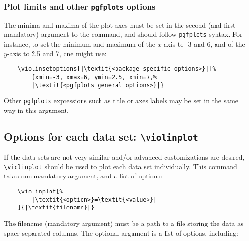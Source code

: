 \documentclass{article}
\begin{document}
\subsubsection{Plot limits and other \texttt{pgfplots} options}

The minima and maxima of the plot axes must be set in the second (and first
mandatory) argument to the command, and should follow \texttt{pgfplots}
syntax. For instance, to set the minimum and maximum of the $x$-axis
to -3 and 6, and of the $y$-axis to 2.5 and 7, one might use:

\begin{verbatim}
	\violinsetoptions[|\textit{<package-specific options>}|]%
		{xmin=-3, xmax=6, ymin=2.5, xmin=7,%
		|\textit{<pgfplots general options>}|}
\end{verbatim}

Other \texttt{pgfplots} expressions such as title or axes labels may be set
in the same way in this argument.

\subsection{Options for each data set: \texttt{{\textbackslash}violinplot}}

If the data sets are not very similar and/or advanced customizations
are desired, \texttt{{\textbackslash}violinplot} should be used to
plot each data set individually.
This command takes one mandatory argument, and a list of options:

\begin{verbatim}
	\violinplot[%
		|\textit{<option>}=\textit{<value>}|
	]{|\textit{filename}|}
\end{verbatim}

The filename (mandatory argument) must be a path to a file storing the data as
space-separated columns. The optional argument is a list of options, including:
\end{document}
